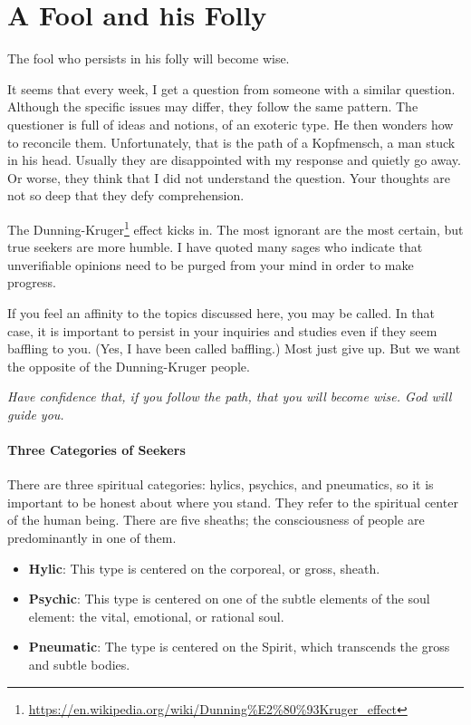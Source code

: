 \section{A Fool and his Folly}

\begin{quotex}
The fool who persists in his folly will become wise.
\end{quotex}

It seems that every week, I get a question from someone with a similar question. Although the specific issues may differ, they follow the same pattern. The questioner is full of ideas and notions, of an exoteric type. He then wonders how to reconcile them. Unfortunately, that is the path of a Kopfmensch, a man stuck in his head. Usually they are disappointed with my response and quietly go away. Or worse, they think that I did not understand the question. Your thoughts are not so deep that they defy comprehension.

The Dunning-Kruger\footnote{\url{https://en.wikipedia.org/wiki/Dunning\%E2\%80\%93Kruger_effect}} effect kicks in. The most ignorant are the most certain, but true seekers are more humble. I have quoted many sages who indicate that unverifiable opinions need to be purged from your mind in order to make progress.

If you feel an affinity to the topics discussed here, you may be called. In that case, it is important to persist in your inquiries and studies even if they seem baffling to you. (Yes, I have been called baffling.) Most just give up. But we want the opposite of the Dunning-Kruger people.

\emph{Have confidence that, if you follow the path, that you will become wise. God will guide you.}

\paragraph{Three Categories of Seekers}


There are three spiritual categories: hylics, psychics, and pneumatics, so it is important to be honest about where you stand. They refer to the spiritual center of the human being. There are five sheaths; the consciousness of people are predominantly in one of them.

\begin{itemize}


\item \textbf{Hylic}: This type is centered on the corporeal, or gross, sheath.

\item \textbf{Psychic}: This type is centered on one of the subtle elements of the soul element: the vital, emotional, or rational soul.

\item \textbf{Pneumatic}: The type is centered on the Spirit, which transcends the gross and subtle bodies.
\end{itemize}



